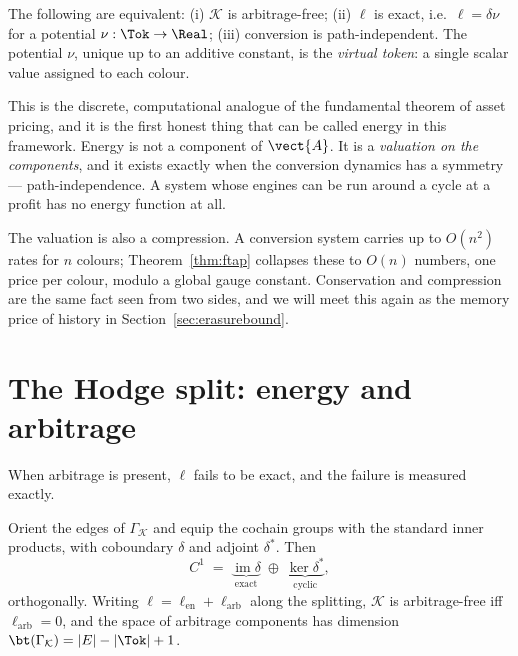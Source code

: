 \begin{theorem}
\label{thm:ftap}
The following are equivalent: (i) $\mathcal{K}$ is arbitrage-free; (ii)
$\ell$ is exact, i.e.\ $\ell = \delta\nu$ for a potential
$\nu : \Tok \to \Real$; (iii) conversion is path-independent.  The
potential $\nu$, unique up to an additive constant, is the
\emph{virtual token}: a single scalar value assigned to each colour.
\end{theorem}

This is the discrete, computational analogue of the fundamental theorem of
asset pricing, and it is the first honest thing that can be called energy
in this framework.  Energy is not a component of $\vect{A}$.  It is a
\emph{valuation on the components}, and it exists exactly when the
conversion dynamics has a symmetry --- path-independence.  A system whose
engines can be run around a cycle at a profit has no energy function at
all.

\begin{remark}[Compression]
The valuation is also a compression.  A conversion system carries up to
$O(n^2)$ rates for $n$ colours; Theorem~\ref{thm:ftap} collapses these to
$O(n)$ numbers, one price per colour, modulo a global gauge constant.
Conservation and compression are the same fact seen from two sides, and we
will meet this again as the memory price of history in
Section~\ref{sec:erasurebound}.
\end{remark}

\section{The Hodge split: energy and arbitrage}

When arbitrage is present, $\ell$ fails to be exact, and the failure is
measured exactly.

\begin{proposition}
\label{prop:hodge}
Orient the edges of $\Gamma_{\mathcal K}$ and equip the cochain groups
with the standard inner products, with coboundary $\delta$ and adjoint
$\delta^{\ast}$.  Then
\[
  C^1 \;=\; \underbrace{\operatorname{im}\delta}_{\text{exact}}
        \;\oplus\; \underbrace{\ker\delta^{\ast}}_{\text{cyclic}},
\]
orthogonally.  Writing $\ell = \ell_{\mathrm{en}} + \ell_{\mathrm{arb}}$
along the splitting, $\mathcal{K}$ is arbitrage-free iff
$\ell_{\mathrm{arb}} = 0$, and the space of arbitrage components has
dimension $\bt(\Gamma_{\mathcal K}) = |E| - |\Tok| + 1$.
\end{proposition}

